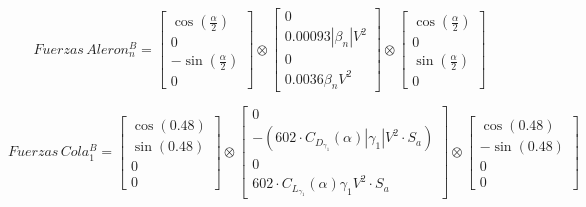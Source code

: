 \documentclass{article}
\begin{document}
\[
  Fuerzas\,Aleron_n^B = \begin{bmatrix}
                          \cos\!\left( \tfrac{\alpha}{2} \right)  \\[6pt]
                          0                                       \\[6pt]
                          -\sin\!\left( \tfrac{\alpha}{2} \right) \\[6pt]
                          0
                        \end{bmatrix}
  \otimes \begin{bmatrix}
            0                                 \\[6pt]
            0.00093 \left| \beta_n \right|V^2 \\[6pt]
            0                                 \\[6pt]
            0.0036\beta_nV^2
          \end{bmatrix}
  \otimes \begin{bmatrix}
            \cos\!\left( \tfrac{\alpha}{2} \right) \\[6pt]
            0                                      \\[6pt]
            \sin\!\left( \tfrac{\alpha}{2} \right) \\[6pt]
            0
          \end{bmatrix}
\]

\[
  Fuerzas\,Cola_1^B = \begin{bmatrix}
                        \cos(0.48) \\[6pt]
                        \sin(0.48) \\[6pt]
                        0          \\[6pt]
                        0
                      \end{bmatrix}
  \otimes \begin{bmatrix}
            0                                                                           \\[6pt]
            -(602 \cdot C_{D_{\gamma_{1}}}(\alpha)\left| \gamma_1 \right|V^2 \cdot S_a) \\[6pt]
            0                                                                           \\[6pt]
            602 \cdot C_{L_{\gamma_{1}}}(\alpha)\gamma_1 V^2 \cdot S_a
          \end{bmatrix}
  \otimes \begin{bmatrix}
            \cos(0.48)  \\[6pt]
            -\sin(0.48) \\[6pt]
            0           \\[6pt]
            0
          \end{bmatrix}
\]
\end{document}
